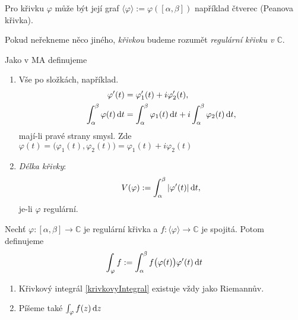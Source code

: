 \begin{note}
Pro křivku $\varphi$ může být její graf $\langle\varphi\rangle:=\varphi([\alpha,\beta])$ například čtverec (Peanova křivka).
\end{note}

\begin{agreement}
Pokud neřekneme něco jiného, \emph{křivkou} budeme rozumět \emph{regulární křivku v $\mathbb{C}$}.
\end{agreement}

\begin{reminder}
Jako v MA definujeme
\begin{enumerate}
    \item Vše po složkách, například.
    \begin{align*}
        \varphi'(t)&=\varphi'_1(t)+i\varphi'_2(t),\\
        \int_\alpha^\beta\varphi(t)\mathop{}\!\mathrm{d} t &=\int_\alpha^\beta\varphi_1(t)\mathop{}\!\mathrm{d} t +i\int_\alpha^\beta\varphi_2(t)\mathop{}\!\mathrm{d} t,
    \end{align*}
    mají-li pravé strany smysl. Zde $\varphi(t)=\big(\varphi_1(t),\varphi_2(t)\big)=\varphi_1(t)+i\varphi_2(t)$
    \item \emph{Délka křivky}: \[V(\varphi):=\int_\alpha^\beta|\varphi'(t)|\mathop{}\!\mathrm{d} t,\] je-li $\varphi$ regulární.
\end{enumerate}
\end{reminder}
\begin{definition}
Nechť $\varphi:[\alpha,\beta]\rightarrow\mathbb{C}$ je regulární křivka a $f:\langle\varphi\rangle\rightarrow\mathbb{C}$ je spojitá. Potom definujeme
\begin{equation}\label{krivkovyIntegral}
    \int_\varphi f:=\int_\alpha^\beta f\big(\varphi(t)\big)\varphi'(t)\mathop{}\!\mathrm{d} t
\end{equation}
\end{definition}
\begin{note}
\mbox{} %
\begin{enumerate}
    \item Křivkový integrál \eqref{krivkovyIntegral} existuje vždy jako Riemannův.
    \item Píšeme také $\int_\varphi f(z)\mathop{}\!\mathrm{d} z$
\end{enumerate}
\end{note}

